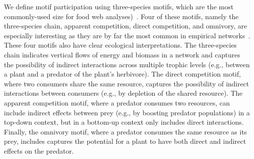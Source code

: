 \documentclass[12pt]{article}
\begin{document}
\begin{spacing}{2.0}
    

    We define motif participation using three-species motifs, which are the most commonly-used size for food web analyses)~\citep{Milo2004,Stouffer2007,Stouffer2012,Cirtwill2015a}. 
    Four of these motifs, namely the three-species chain, apparent competition, direct competition, and omnivory, are especially interesting as they are by far the most common in empirical networks~\citep{Stouffer2007, Borrelli2015a, giling2019plant}.
    These four motifs also have clear ecological interpretations.
    The three-species chain indicates vertical flows of energy and biomass in a network and captures the possibility of indirect interactions across multiple trophic levels (e.g., between a plant and a predator of the plant's herbivore).
    The direct competition motif, where two consumers share the same resource, captures the possibility of indirect interactions between consumers (e.g., by depletion of the shared resource). 
    The apparent competition motif, where a predator consumes two resources, can include indirect effects between prey (e.g., by boosting predator populations) in a top-down context, but in a bottom-up context only includes direct interactions.
    Finally, the omnivory motif, where a predator consumes the same resource as its prey, includes captures the potential for a plant to have both direct and indirect effects on the predator. 
    

\end{spacing}
\end{document}
